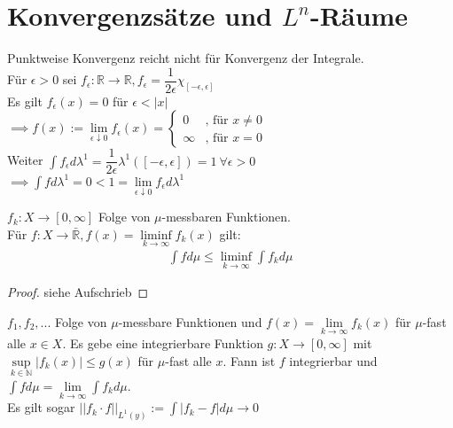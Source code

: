 \chapter{Konvergenzsätze und $L^n$-Räume}
  \begin{example}
    Punktweise Konvergenz reicht nicht für Konvergenz der Integrale.\\
    Für $\epsilon > 0$ sei $f_{\epsilon}: \mathbb{R} \to \mathbb{R}, f_{\epsilon} = \dfrac{1}{2\epsilon} \chi_{[-\epsilon, \epsilon]}$\\
    Es gilt $f_{\epsilon}(x) = 0$ für $\epsilon < |x|$\\
    $\implies f(x) := \lim\limits_{\epsilon \downarrow 0} f_{\epsilon}(x) = \begin{cases}
      0 & \text{, für } x \neq 0\\
      \infty & \text{, für } x = 0
    \end{cases}$\\
    Weiter $\int f_{\epsilon} d\lambda^1 = \dfrac{1}{2\epsilon} \lambda^1([-\epsilon, \epsilon]) = 1 \ \forall \epsilon > 0$\\
    $\implies \int f d\lambda^1 = 0 < 1 = \lim\limits_{\epsilon \downarrow 0} f_{\epsilon} d\lambda^1$
  \end{example}

  \begin{theorem}
    $f_k: X \to [0,\infty]$ Folge von $\mu$-messbaren Funktionen.\\
    Für $f: X \to \bar{\mathbb{R}}, f(x) = \liminf\limits_{k \to \infty} f_k(x)$ gilt:
    \begin{align*}
      \int f d\mu \leq \liminf\limits_{k \to \infty} \int f_k d\mu
    \end{align*}
  \end{theorem}

  \begin{proof}
    siehe Aufschrieb
  \end{proof}

  \begin{theorem}
    $f_1, f_2, ...$ Folge von $\mu$-messbare Funktionen und $f(x) = \lim\limits_{k \to \infty} f_k(x)$ für $\mu$-fast alle $x \in X$. Es gebe eine integrierbare Funktion $g: X \to [0, \infty]$ mit $\sup\limits_{k \in \mathbb{N}} |f_k(x)| \leq g(x)$ für $\mu$-fast alle $x$. Fann ist $f$ integrierbar und $\int f d\mu = \lim\limits_{k \to \infty} \int f_k d\mu$.\\
    Es gilt sogar $||f_k \cdot f||_{L^1(y)} := \int |f_k -f| d\mu \to 0$
  \end{theorem}

